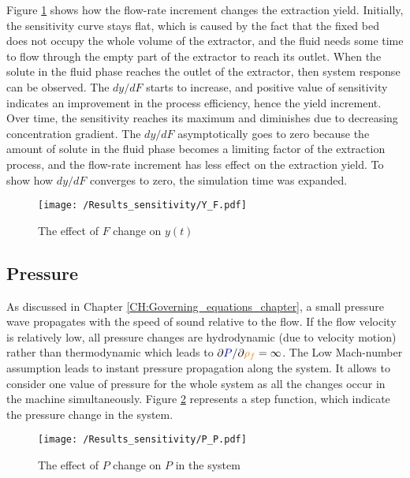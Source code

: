 \documentclass[../Article_Model_Parameters.tex]{subfiles}
\begin{document}
    Figure \ref{fig:Sensitivty_F_y} shows how the flow-rate increment changes the extraction yield. Initially, the sensitivity curve stays flat, which is caused by the fact that the fixed bed does not occupy the whole volume of the extractor, and the fluid needs some time to flow through the empty part of the extractor to reach its outlet. When the solute in the fluid phase reaches the outlet of the extractor, then system response can be observed. The $dy/dF$ starts to increase, and positive value of sensitivity indicates an improvement in the process efficiency, hence the yield increment. Over time, the sensitivity reaches its maximum and diminishes due to decreasing concentration gradient. The $dy/dF$ asymptotically goes to zero because the amount of solute in the fluid phase becomes a limiting factor of the extraction process, and the flow-rate increment has less effect on the extraction yield. To show how $dy / dF$ converges to zero, the simulation time was expanded.
    
    \begin{figure}[h!]
    	\centering
    	\texttt{[image: /Results\_sensitivity/Y\_F.pdf]}
    	\caption{The effect of $F$ change on $y(t)$}
    	\label{fig:Sensitivty_F_y}
    \end{figure}
    
    \subsection{Pressure}
    
    As discussed in Chapter \ref{CH:Governing_equations_chapter}, a small pressure wave propagates with the speed of sound relative to the flow. If the flow velocity is relatively low, all pressure changes are hydrodynamic (due to velocity motion) rather than thermodynamic which leads to $\partial {\color{blue}P}/\partial {\color{orange}\rho_f} = \infty$. The Low Mach-number assumption leads to instant pressure propagation along the system. It allows to consider one value of pressure for the whole system as all the changes occur in the machine simultaneously. Figure \ref{fig:Sensitivty_P_P} represents a step function, which indicate the pressure change in the system. 
    
    \begin{figure}[h!]
    	\centering
    	\texttt{[image: /Results\_sensitivity/P\_P.pdf]}
    	\caption{The effect of $P$ change on $P$ in the system}
    	\label{fig:Sensitivty_P_P}
    \end{figure}
    
\end{document}
